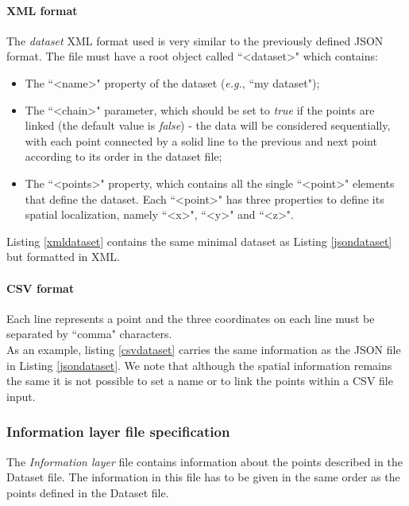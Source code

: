 \documentclass[10pt]{bmc_article}
\newenvironment{bmcformat}{\baselineskip20pt\sloppy\setboolean{publ}{false}}{\baselineskip20pt\sloppy}
\begin{document}
\begin{bmcformat}
\paragraph{XML format}
The {\it{dataset}} XML format used is very similar to the previously defined JSON format. The file must have a root object called ``<dataset>" which contains: \begin{itemize}
\item{The ``\textless name>" property of the dataset (\textit{e.g.}, ``my dataset");}
\item{The ``<chain>" parameter, which should be set to \textit{true} if the points are linked (the default value is \textit{false}) - the data will be considered sequentially, with each point connected by a solid line to the previous and next point according to its order in the dataset file;}
\item{The ``<points>" property, which contains all the single ``<point>" elements that define the dataset. Each ``<point>" has three properties to define its spatial localization, namely ``<x>", ``<y>" and ``<z>".}
\end{itemize}

Listing \ref{xmldataset} contains the same minimal dataset as Listing \ref{jsondataset} but formatted in XML.

\paragraph{CSV format}
Each line represents a point and the three coordinates on each line must be separated by ``comma" characters.\\As an example, listing \ref{csvdataset} carries the same information as the JSON file in Listing \ref{jsondataset}. We note that although the spatial information remains the same it is not possible to set a name or to link the points within a CSV file input.



\subsubsection{Information layer file specification}The {\it{Information layer}} file contains information about the points described in the Dataset file. The information in this file has to be given in the same order as the points defined in the Dataset file.


\end{bmcformat}
\end{document}
